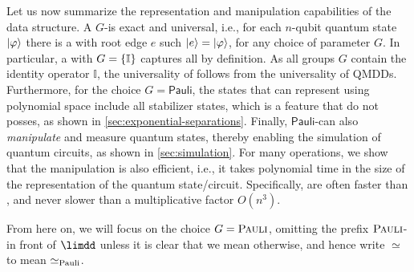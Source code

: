 Let us now summarize the representation and manipulation capabilities of the \limdd data structure.
A $G$-\limdd is exact and universal, i.e., for each $n$-qubit quantum state $\ket{\varphi}$ there is a \limdd with root edge $e$ such $\ket e = \ket{\varphi}$, for any choice of parameter $G$.
In particular, a \glimdd with $G=\left\lbrace \mathbb I \right\rbrace$ captures all \qmdds by definition.
As all groups $G$ contain the identity operator $\mathbb I$, the universality of \limdds follows from the universality of QMDDs.
Furthermore, for the choice $G=\textsf{Pauli}$, the states that \limdds can represent using polynomial space include all stabilizer states, which is a feature that \qmdds do not posses, as shown in \autoref{sec:exponential-separations}.
Finally, $\textsf{Pauli}$-\limdds can also \emph{manipulate} and measure quantum states, thereby enabling the simulation of quantum circuits, as shown in \autoref{sec:simulation}. 
For many operations, we show that the manipulation is also efficient, i.e., it takes polynomial time in the size of the \limdd representation of the quantum state/circuit.
Specifically, \limdds are often faster than \qmdds, and never slower than a multiplicative factor $O(n^3)$.

From here on, we will focus on the choice $G=\textsc{Pauli}$, omitting the prefix $\textsc{Pauli}$- in front of $\limdd$ unless it is clear that we mean otherwise, and hence write $\simeq$ to mean $\simeq_{\textnormal{Pauli}}$.


%
%


